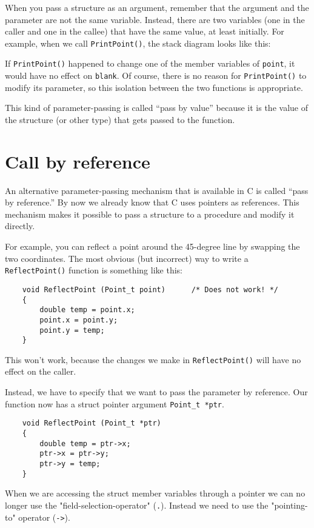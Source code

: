 When you pass a structure as an argument, remember that the
argument and the parameter are not the same variable.  Instead,
there are two variables (one in the caller and one in the
callee) that have the same value, at least initially.  For
example, when we call {\tt PrintPoint()}, the stack diagram
looks like this:

\vspace{0.1in}
\centerline{}
\vspace{0.1in}
%
If {\tt PrintPoint()} happened to change one of the member variables
of {\tt point}, it would have no effect on {\tt blank}.  Of course, there
is no reason for {\tt PrintPoint()} to modify its parameter, so this
isolation between the two functions is appropriate.

This kind of parameter-passing is called ``pass by value''
because it is the value of the structure (or other type) that
gets passed to the function.

\section{Call by reference}
\label{Call by reference}

An alternative parameter-passing mechanism that is available
in C is called ``pass by reference.''  
By now we already know that C uses pointers as references.
This mechanism makes
it possible to pass a structure to a procedure and modify it directly.

For example, you can reflect a point around the 45-degree line by
swapping the two coordinates.  The most obvious (but incorrect) way to
write a {\tt ReflectPoint()} function is something like this:

\begin{verbatim}
	void ReflectPoint (Point_t point)      /* Does not work! */
	{
		double temp = point.x;
		point.x = point.y;
		point.y = temp;
	}
\end{verbatim}
%
This won't work, because the changes we make in {\tt ReflectPoint()}
will have no effect on the caller.

Instead, we have to specify that we want to pass the parameter by
reference.  
Our function now has a struct pointer argument {\tt Point\_t~*ptr}.


\begin{verbatim}
	void ReflectPoint (Point_t *ptr)
	{
		double temp = ptr->x;
		ptr->x = ptr->y;
		ptr->y = temp;
	}
\end{verbatim}
When we are accessing the struct member variables through a pointer 
we can no longer use the "field-selection-operator" ({\tt .}). Instead we need to use
the "pointing-to" operator ({\tt ->}).

